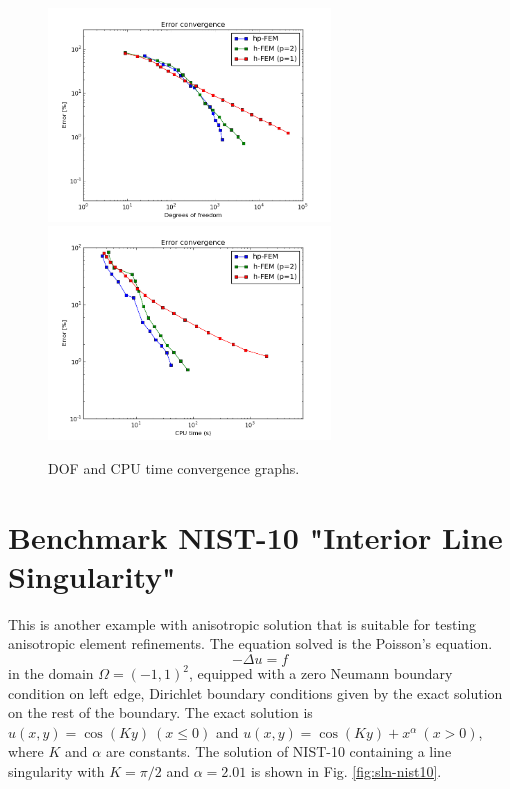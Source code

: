 \documentclass[12pt]{elsarticle}
\begin{document}
\begin{figure}[H]
\centering
\vspace{-3mm}
\hspace{-50mm}
\includegraphics[width=7.5cm]{nist/nist-9/conv_dof_aniso.png}\ \
\hspace{-10mm}
\includegraphics[width=7.5cm]{nist/nist-9/conv_cpu_aniso.png}
\hspace{-50mm}
\caption{DOF and CPU time convergence graphs.}
\label{fig:nist-9-conv}
\end{figure}


\section{Benchmark NIST-10 "Interior Line Singularity"}
\label{sec:bench-10}

This is another example with anisotropic solution that is suitable for testing
anisotropic element refinements. The equation solved is the Poisson's equation.
\begin{equation} \label{interior}
-\Delta u = f
\end{equation}
in the domain $\Omega = (-1, 1)^2$, equipped with a zero
Neumann boundary condition on left edge, Dirichlet boundary
conditions given by the exact solution on the rest of the boundary.
The exact solution is
$u(x,y) = \cos(Ky)\ (x \le 0)$ and $u(x,y) = \cos(Ky) + x^{\alpha}\ (x > 0)$,
where $K$ and $\alpha$ are constants.
The solution of NIST-10 containing a line singularity with $K = \pi/2$ and
$\alpha = 2.01$ is shown in Fig. \ref{fig:sln-nist10}.
\end{document}
